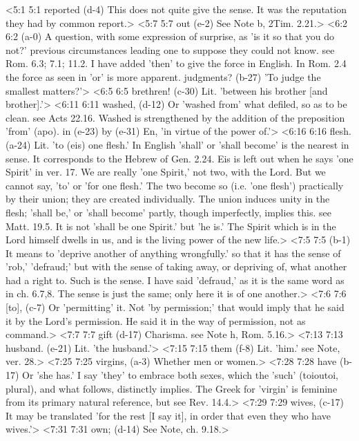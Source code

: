 <5:1 5:1  reported (d-4)  This does not quite give the sense. It was the reputation  they had by common report.>
<5:7 5:7  out (e-2)  See Note b, 2Tim. 2.21.>
<6:2 6:2   (a-0)  A question, with some expression of surprise, as 'is it so  that you do not?' previous circumstances leading one to suppose  they could not know. see Rom. 6.3; 7.1; 11.2. I have added  'then' to give the force in English. In Rom. 2.4 the force as  seen in 'or' is more apparent.
  judgments? (b-27)  'To judge the smallest matters?'>
<6:5 6:5  brethren! (c-30)  Lit. 'between his brother [and brother].'>
<6:11 6:11  washed, (d-12)  Or 'washed from' what defiled, so as to be clean. see Acts 22.16. Washed is strengthened by the addition of the  preposition 'from' (apo).
  in (e-23)  by (e-31)  En, 'in virtue of the power of.'>
<6:16 6:16  flesh. (a-24)  Lit. 'to (eis) one flesh.' In English 'shall' or 'shall  become' is the nearest in sense. It corresponds to the Hebrew  of Gen. 2.24. Eis is left out when he says 'one Spirit' in  ver. 17. We are really 'one Spirit,' not two, with the Lord.  But we cannot say, 'to' or 'for one flesh.' The two become so  (i.e. 'one flesh') practically by their union; they are created  individually. The union induces unity in the flesh; 'shall be,'  or 'shall become' partly, though imperfectly, implies this. see  Matt. 19.5. It is not 'shall be one Spirit.' but 'he is.' The  Spirit which is in the Lord himself dwells in us, and is the  living power of the new life.>
<7:5 7:5   (b-1)  It means to 'deprive another of anything wrongfully.' so that  it has the sense of 'rob,' 'defraud;' but with the sense of  taking away, or depriving of, what another had a right to. Such  is the sense. I have said 'defraud,' as it is the same word as  in ch. 6.7,8. The sense is just the same; only here it is of  one another.>
<7:6 7:6  [to], (c-7)  Or 'permitting' it. Not 'by permission;' that would imply  that he said it by the Lord's permission. He said it in the way  of permission, not as command.>
<7:7 7:7  gift (d-17)  Charisma. see Note h, Rom. 5.16.>
<7:13 7:13  husband. (e-21)  Lit. 'the husband.'>
<7:15 7:15  them (f-8)  Lit. 'him.' see Note, ver. 28.>
<7:25 7:25  virgins, (a-3)  Whether men or women.>
<7:28 7:28  have (b-17)  Or 'she has.' I say 'they' to embrace both sexes, which the  'such' (toioutoi, plural), and what follows, distinctly  implies. The Greek for 'virgin' is feminine from its primary  natural reference, but see Rev. 14.4.>
<7:29 7:29  wives, (c-17)  It may be translated 'for the rest [I say it], in order that  even they who have wives.'>
<7:31 7:31  own; (d-14)  See Note, ch. 9.18.>
